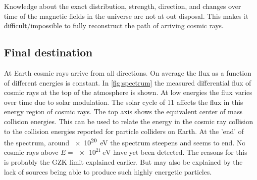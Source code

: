 Knowledge about the exact distribution, strength, direction, and changes over time of the magnetic fields in the universe are not at out disposal. This makes it difficult/impossible to fully reconstruct the path of arriving cosmic rays.


\subsection{Final destination}

At Earth cosmic rays arrive from all directions. On average the flux as a function of different energies is constant. In \cref{fig:spectrum} the measured differential flux of cosmic rays at the top of the atmosphere is shown. At low energies the flux varies over time due to solar modulation. The solar cycle of \SI{11}{\year} affects the flux in this energy region of cosmic rays. The top axis shows the equivalent center of mass collision energies. This can be used to relate the energy in the cosmic ray collision to the collision energies reported for particle colliders on Earth. At the 'end' of the spectrum, around \SI{e20}{\eV} the spectrum steepens and seems to end. No cosmic rays above $E = \SI{e21}{\eV}$ have yet been detected. The reasons for this is probably the GZK limit explained earlier. But may also be explained by the lack of sources being able to produce such highly energetic particles.


